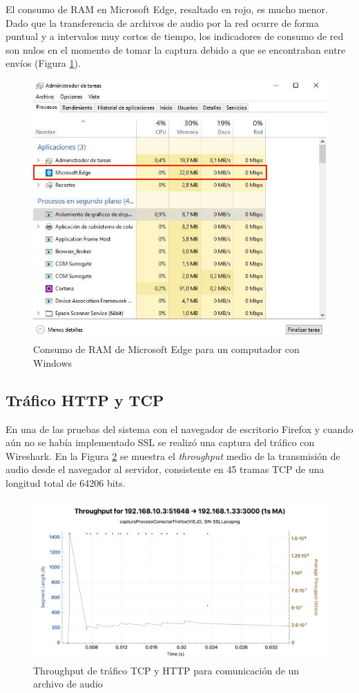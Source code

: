 El consumo de RAM en Microsoft Edge, resaltado en rojo, es mucho menor. Dado que la transferencia de archivos de audio por la red ocurre de forma puntual y a intervalos muy cortos de tiempo, los indicadores de consumo de red son nulos en el momento de tomar la captura debido a que se encontraban entre envíos (Figura \ref{edgeRAM}).

\begin{figure}[!t]
\begin{center}
\includegraphics[width=0.75\linewidth]{./6_EvalEmpirica/Img/edgeRAM.jpg}
\end{center}
\caption{Consumo de RAM de Microsoft Edge para un computador con Windows}
\label{edgeRAM}
\end{figure}

\subsection{Tráfico HTTP y TCP}

En una de las pruebas del sistema con el navegador de escritorio Firefox y cuando aún no se había implementado SSL se realizó una captura del tráfico con Wireshark. En la Figura \ref{traffic} se muestra el \emph{throughput} medio de la transmisión de audio desde el navegador al servidor, consistente en 45 tramas TCP de una longitud total de 64206 bits.

\begin{figure}[!t]
\begin{center}
\includegraphics[width=0.75\linewidth]{./6_EvalEmpirica/Img/traffic.png}
\end{center}
\caption{Throughput de tráfico TCP y HTTP para comunicación de un archivo de audio}
\label{traffic}
\end{figure}

